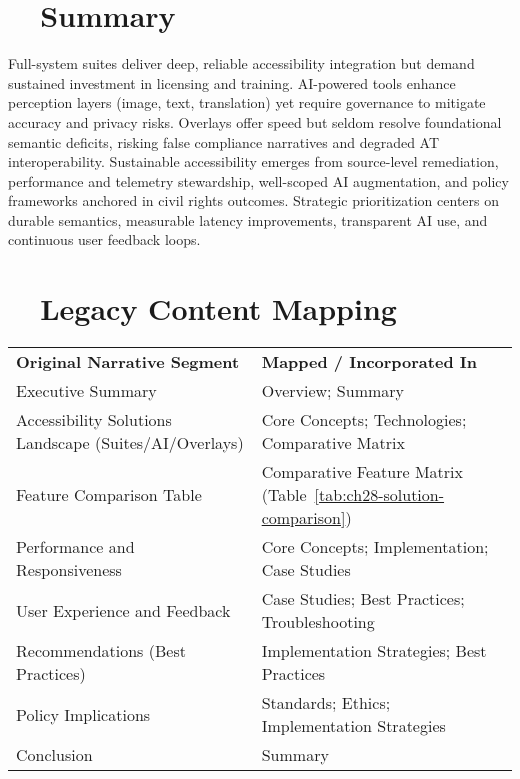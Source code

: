 \section{~~Summary}
\label{sec:ch28-summary}
Full-system suites deliver deep, reliable accessibility integration but demand sustained investment in licensing and training. AI-powered tools enhance perception layers (image, text, translation) yet require governance to mitigate accuracy and privacy risks. Overlays offer speed but seldom resolve foundational semantic deficits, risking false compliance narratives and degraded AT interoperability. Sustainable accessibility emerges from source-level remediation, performance and telemetry stewardship, well-scoped AI augmentation, and policy frameworks anchored in civil rights outcomes. Strategic prioritization centers on durable semantics, measurable latency improvements, transparent AI use, and continuous user feedback loops.

\section{~~Legacy Content Mapping}
\label{sec:ch28-legacy-mapping}
\begin{tabular}{p{} p{}}
	\textbf{Original Narrative Segment}                    & \textbf{Mapped / Incorporated In}                                     \\
	Executive Summary                                      & Overview; Summary                                                     \\
	Accessibility Solutions Landscape (Suites/AI/Overlays) & Core Concepts; Technologies; Comparative Matrix                       \\
	Feature Comparison Table                               & Comparative Feature Matrix (Table~\ref{tab:ch28-solution-comparison}) \\
	Performance and Responsiveness                         & Core Concepts; Implementation; Case Studies                           \\
	User Experience and Feedback                           & Case Studies; Best Practices; Troubleshooting                         \\
	Recommendations (Best Practices)                       & Implementation Strategies; Best Practices                             \\
	Policy Implications                                    & Standards; Ethics; Implementation Strategies                          \\
	Conclusion                                             & Summary                                                               \\
\end{tabular}

